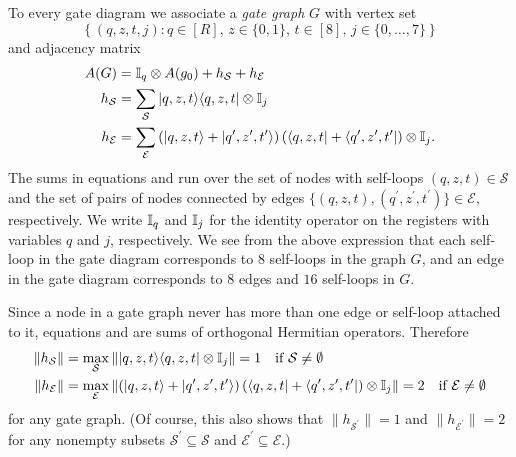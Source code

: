 \documentclass[../thesis-main/thesis-main]{subfiles}
\begin{document}
To every gate diagram we associate a \emph{gate graph} $G$ with
vertex set 
\[
\left\{ (q,z,t,j)\colon q\in[R],\, z\in\{0,1\},\, t\in[8],\, j\in\{0,\ldots,7\}\right\} 
\]
and adjacency matrix 
\begin{align}
A(G) & =\mathbb{I}_{q}\otimes A(g_{0})+h_{\mathcal{S}}+h_{\mathcal{E}}\label{eq:adj_gate_graph}\\
h_{\mathcal{S}} & =\sum_{\mathcal{S}}|q,z,t\rangle\langle q,z,t|\otimes\mathbb{I}_{j}\label{eq:h_loops}\\
h_{\mathcal{E}} & =\sum_{\mathcal{E}}\left(|q,z,t\rangle+|q^{\prime},z^{\prime},t^{\prime}\rangle\right)\left(\langle q,z,t|+\langle q^{\prime},z^{\prime},t^{\prime}|\right)\otimes\mathbb{I}_{j}.\label{eq:h_edges}
\end{align}
The sums in equations  and  run over the set of nodes with self-loops $(q,z,t)\in\mathcal{S}$ and the set of pairs of nodes connected by edges $\{(q,z,t),(q^{\prime},z^{\prime},t^{\prime})\}\in\mathcal{E}$, respectively. We write $\mathbb{I}_{q}$ and $\mathbb{I}_{j}$ for the identity operator on the registers with variables $q$ and $j$, respectively. We see from the above expression that each self-loop in the gate diagram corresponds to $8$ self-loops in the graph $G$, and an edge in the gate diagram corresponds to $8$ edges and $16$ self-loops in $G$.

Since a node in a gate graph never has more than one edge or self-loop attached to it, equations  and  are sums of orthogonal Hermitian operators.  Therefore 
\begin{align}
\left\Vert h_{\mathcal{S}}\right\Vert  & =\max_{\mathcal{S}}\left\Vert |q,z,t\rangle\langle q,z,t|\otimes\mathbb{I}_{j}\right\Vert =1\quad\text{if }\mathcal{S}\neq\emptyset\label{eq:h_S_bound}\\
\left\Vert h_{\mathcal{E}}\right\Vert  & =\max_{\mathcal{E}}\left\Vert \left(|q,z,t\rangle+|q^{\prime},z^{\prime},t^{\prime}\rangle\right)\left(\langle q,z,t|+\langle q^{\prime},z^{\prime},t^{\prime}|\right)\otimes\mathbb{I}_{j}\right\Vert =2\quad\text{if }\mathcal{E}\neq\emptyset\label{eq:h_E_bound}
\end{align}
for any gate graph. (Of course, this also shows that $\|{h_{\mathcal{S}^\prime}}\|=1$ and $\|{h_{\mathcal{E}^\prime}}\|=2$ for any nonempty subsets $\mathcal{S}^\prime\subseteq \mathcal{S}$ and $\mathcal{E}^\prime\subseteq \mathcal{E}$.)



\end{document}
